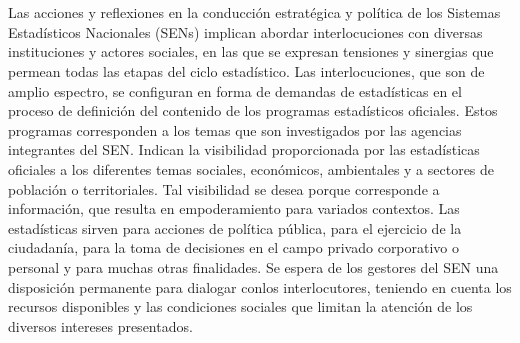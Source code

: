 \begin{center}
\textbf{\textcolor{ultramarine}{\titulo \\}}
\bigskip
\textit{\presentador \\}
\bigskip
\scriptsize{\lugar}
\bigskip
\end{center}

\noindent Las acciones y reflexiones en la conducción estratégica y política de los Sistemas Estadísticos Nacionales (SENs) implican abordar interlocuciones con diversas instituciones y actores sociales, en las que se expresan tensiones y sinergias que permean todas las etapas del ciclo estadístico. Las interlocuciones, que son de amplio espectro, se configuran en forma de demandas de estadísticas en el proceso de definición del contenido de los programas estadísticos oficiales. Estos programas corresponden a los temas que son investigados por las agencias integrantes del SEN. Indican la visibilidad proporcionada por las estadísticas oficiales a los diferentes temas sociales, económicos, ambientales y a sectores de población o territoriales. Tal visibilidad se desea porque corresponde a información, que resulta en empoderamiento para variados contextos. Las estadísticas sirven para acciones de política pública, para el ejercicio de la ciudadanía, para la toma de decisiones en el campo privado corporativo o personal y para muchas otras finalidades. Se espera de los gestores del SEN una disposición permanente para dialogar conlos interlocutores, teniendo en cuenta los recursos disponibles y las condiciones sociales que limitan la atención de los diversos intereses presentados.

